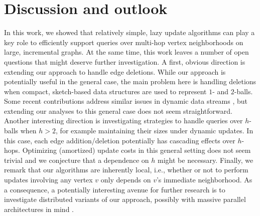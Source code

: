 \section{Discussion and outlook}\label{sec:concl}
In this work, we showed that relatively simple, lazy update algorithms can play a key role to efficiently support queries over multi-hop vertex neighborhoods on large, incremental graphs.
At the same time, this work leaves a number of open questions that might deserve further investigation. A first, obvious direction is extending our approach to handle edge deletions. While our approach is  potentially useful in the general case, the main problem here is handling deletions when compact, sketch-based data structures are used to represent $1$- and $2$-balls. Some recent contributions address similar issues in dynamic data streams \cite{BSS20,CGPS24}, but extending our analyses to this general case does not seem straightforward. Another interesting direction is investigating strategies to handle queries over $h$-balls when $h > 2$, for example maintaining their sizes under dynamic updates. In this case, each edge addition/deletion potentially has cascading effects over $h$-hops. Optimizing (amortized) update costs in this general setting does not seem trivial and we conjecture that a dependence on $h$ might be necessary. Finally, we remark that our algorithms are inherently local, i.e., whether or not to perform updates involving any vertex $v$ only depends on $v$'s immediate neighborhood. As a consequence, a potentially interesting avenue for further research is to investigate distributed variants of our approach, possibly with massive parallel architectures in mind \cite{lee2012parallel}.
